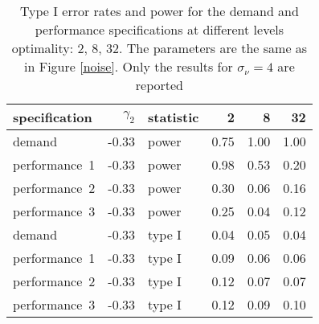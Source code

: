 \begin{table}[ht]
\centering
\begingroup\footnotesize
\begin{tabular}{lrlrrr}
  \hline
specification & $\gamma_2$ & statistic & 2 & 8 & 32 \\ 
  \hline
demand & -0.33 & power & 0.75 & 1.00 & 1.00 \\ 
  performance~1 & -0.33 & power & 0.98 & 0.53 & 0.20 \\ 
  performance~2 & -0.33 & power & 0.30 & 0.06 & 0.16 \\ 
  performance~3 & -0.33 & power & 0.25 & 0.04 & 0.12 \\ 
  demand & -0.33 & type I & 0.04 & 0.05 & 0.04 \\ 
  performance~1 & -0.33 & type I & 0.09 & 0.06 & 0.06 \\ 
  performance~2 & -0.33 & type I & 0.12 & 0.07 & 0.07 \\ 
  performance~3 & -0.33 & type I & 0.12 & 0.09 & 0.10 \\ 
   \hline
\end{tabular}
\endgroup
\caption{Type I error rates and power for the demand 
  and performance specifications at different levels optimality: 
  2, 8, 32. The parameters are the same as in Figure \ref{noise}.
  Only the results for $\sigma_{\nu} = 4$ are reported} 
\label{noise-table}
\end{table}
